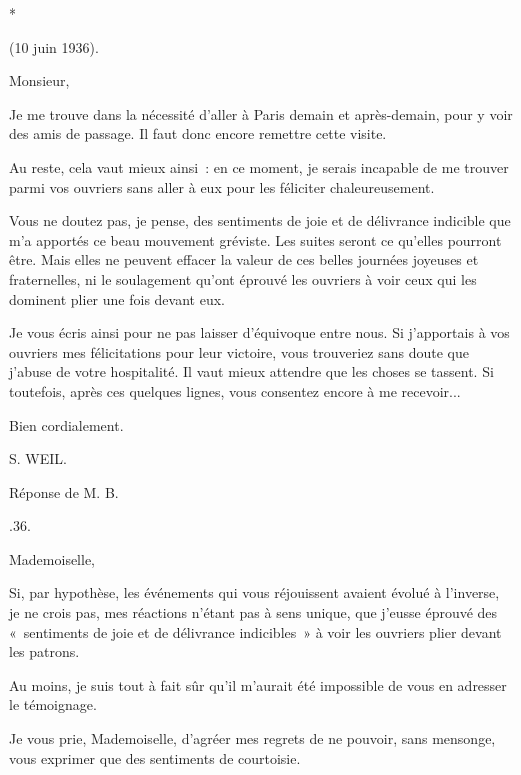 \documentclass[french,twoside]{book} %
\begin{document}
\begin{center}
*\end{center}
 (10 juin 1936).\par
\noindent Monsieur,\par
Je me trouve dans la nécessité d'aller à Paris demain et après-demain, pour y voir des amis de passage. Il faut donc encore remettre cette visite.\par
Au reste, cela vaut mieux ainsi : en ce moment, je serais incapable de me trouver parmi vos ouvriers sans aller à eux pour les féliciter chaleureusement.\par
Vous ne doutez pas, je pense, des sentiments de joie et de délivrance indicible que m'a apportés ce beau mouvement gréviste. Les suites seront ce qu'elles pourront être. Mais elles ne peuvent effacer la valeur de ces belles journées joyeuses et fraternelles, ni le soulagement qu'ont éprouvé les ouvriers à voir ceux qui les dominent plier une fois devant eux.\par
Je vous écris ainsi pour ne pas laisser d'équivoque entre nous. Si j'apportais à vos ouvriers mes félicitations pour leur victoire, vous trouveriez sans doute que j'abuse de votre hospitalité. Il vaut mieux attendre que les choses se tassent. Si toutefois, après ces quelques lignes, vous consentez encore à me recevoir...\par
Bien cordialement.\par
S. WEIL.\par

\begin{center}
Réponse de M. B.\end{center}
.36.\par
\noindent Mademoiselle,\par
Si, par hypothèse, les événements qui vous réjouissent avaient évolué à l'inverse, je ne crois pas, mes réactions n'étant pas à sens unique, que j'eusse éprouvé des « sentiments de joie et de délivrance indicibles » à voir les ouvriers plier devant les patrons.\par
Au moins, je suis tout à fait sûr qu'il m'aurait été impossible de vous en adresser le témoignage.\par
Je vous prie, Mademoiselle, d'agréer mes regrets de ne pouvoir, sans mensonge, vous exprimer que des sentiments de courtoisie.\par
\end{document}
